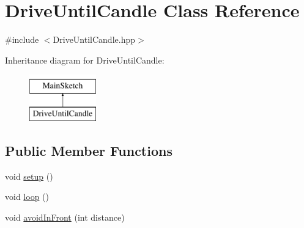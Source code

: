 \hypertarget{classDriveUntilCandle}{\section{Drive\-Until\-Candle Class Reference}
\label{classDriveUntilCandle}
}


{\ttfamily \#include $<$Drive\-Until\-Candle.\-hpp$>$}

Inheritance diagram for Drive\-Until\-Candle\-:\begin{figure}[H]
\begin{center}
\leavevmode
\includegraphics[height=2.000000cm]{classDriveUntilCandle}
\end{center}
\end{figure}
\subsection*{Public Member Functions}
\begin{DoxyCompactItemize}
\item 
void \hyperlink{classDriveUntilCandle_a520ee2277625ce84b594b0a073d23f84}{setup} ()
\item 
void \hyperlink{classDriveUntilCandle_a6c5970d7250b2fd9658bb1a84d2a4ce7}{loop} ()
\item 
void \hyperlink{classDriveUntilCandle_a0d72ef9e0ab6b731b36ecfce2b4fa6f2}{avoid\-In\-Front} (int distance)
\end{DoxyCompactItemize}

